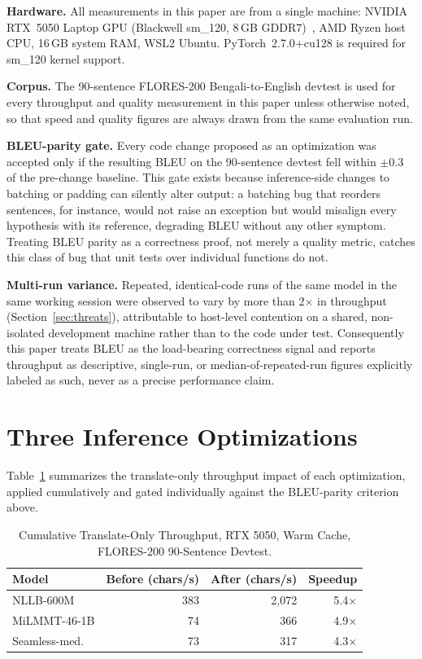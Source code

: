 \documentclass[conference]{IEEEtran}
\newcommand{\NLLBBEFORECHS}{383}
\newcommand{\NLLBAFTERCHS}{2{,}072}
\newcommand{\NLLBSPEEDUP}{5.4$\times$}
\newcommand{\MILMMTBEFORECHS}{74}
\newcommand{\MILMMTAFTERCHS}{366}
\newcommand{\MILMMTSPEEDUP}{4.9$\times$}
\newcommand{\SEAMLESSBEFORECHS}{73}
\newcommand{\SEAMLESSAFTERCHS}{317}
\newcommand{\SEAMLESSSPEEDUP}{4.3$\times$}
\begin{document}
\textbf{Hardware.} All measurements in this paper are from a single
machine: NVIDIA RTX~5050 Laptop GPU (Blackwell sm\_120, 8\,GB
GDDR7)~\cite{nvidia_blackwell}, AMD Ryzen host CPU, 16\,GB system RAM,
WSL2 Ubuntu. PyTorch~2.7.0+cu128 is required for sm\_120 kernel support.

\textbf{Corpus.} The 90-sentence FLORES-200 Bengali-to-English devtest is
used for every throughput and quality measurement in this paper unless
otherwise noted, so that speed and quality figures are always drawn from
the same evaluation run.

\textbf{BLEU-parity gate.} Every code change proposed as an optimization
was accepted only if the resulting BLEU on the 90-sentence devtest fell
within $\pm$0.3 of the pre-change baseline. This gate exists because
inference-side changes to batching or padding can silently alter output:
a batching bug that reorders sentences, for instance, would not raise an
exception but would misalign every hypothesis with its reference,
degrading BLEU without any other symptom. Treating BLEU parity as a
correctness proof, not merely a quality metric, catches this class of bug
that unit tests over individual functions do not.

\textbf{Multi-run variance.} Repeated, identical-code runs of the same
model in the same working session were observed to vary by more than
2$\times$ in throughput (Section~\ref{sec:threats}), attributable to
host-level contention on a shared, non-isolated development machine
rather than to the code under test. Consequently this paper treats BLEU
as the load-bearing correctness signal and reports throughput as
descriptive, single-run, or median-of-repeated-run figures explicitly
labeled as such, never as a precise performance claim.

\section{Three Inference Optimizations}
\label{sec:optimizations}

Table~\ref{tab:optsteps} summarizes the translate-only throughput impact
of each optimization, applied cumulatively and gated individually against
the BLEU-parity criterion above.

\begin{table}[htbp]
\caption{Cumulative Translate-Only Throughput, RTX 5050, Warm Cache,
         FLORES-200 90-Sentence Devtest.}
\label{tab:optsteps}
\centering
\begin{tabular}{lrrr}
\toprule
Model & Before (chars/s) & After (chars/s) & Speedup \\
\midrule
NLLB-600M     & \NLLBBEFORECHS{}    & \NLLBAFTERCHS{}    & \NLLBSPEEDUP{} \\
MiLMMT-46-1B  & \MILMMTBEFORECHS{}  & \MILMMTAFTERCHS{}  & \MILMMTSPEEDUP{} \\
Seamless-med. & \SEAMLESSBEFORECHS{}& \SEAMLESSAFTERCHS{}& \SEAMLESSSPEEDUP{} \\
\bottomrule
\end{tabular}
\end{table}
\end{document}
